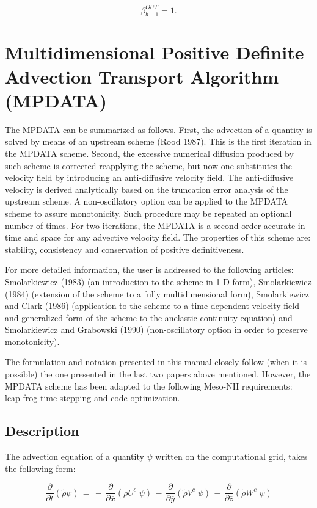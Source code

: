 \begin{equation}
\beta^{OUT}_{b-1}=1.
\end{equation}

\section{Multidimensional Positive Definite Advection Transport Algorithm (MPDATA)}

The MPDATA can be summarized as follows.
First, the advection of a quantity is solved by means of an upstream scheme
(Rood 1987). This is the first iteration in the MPDATA scheme.
Second, the excessive numerical diffusion produced by such scheme is
corrected reapplying the scheme, but now one substitutes the velocity field by
introducing an
anti-diffusive velocity field. The anti-diffusive velocity is derived analytically
based on the truncation error analysis of the upstream scheme.
A non-oscillatory option can be applied to the MPDATA scheme to assure monotonicity.
Such procedure may be repeated an optional number
of times. For two iterations, the  MPDATA is a second-order-accurate in time
and space for any
advective velocity field.
The properties
of this scheme are: stability, consistency and conservation of positive
definitiveness.

For more detailed information, the user is addressed to the following articles:
Smolarkiewicz (1983) (an introduction to the scheme in 1-D form), Smolarkiewicz
(1984) (extension of the scheme to a fully multidimensional form), Smolarkiewicz
and Clark (1986) (application to the scheme to a time-dependent velocity field
and generalized form of the scheme
to the anelastic continuity equation) and Smolarkiewicz and
Grabowski (1990) (non-oscillatory option in order to preserve monotonicity).

The formulation and notation presented in this manual closely follow (when
it is possible) the one
presented in the last two papers above mentioned. However, the MPDATA scheme
has been adapted to the following Meso-NH requirements: leap-frog time stepping and
code optimization.

\subsection{Description}

The advection equation of a quantity $\psi$ written on the computational
grid, takes the following form:

\begin{equation}
\dfrac{\partial}{\partial t}(\tilde{\rho}\psi) \, =
 \, - \, \dfrac{\partial }{\partial \overline{x}} (\tilde{\rho} U^{c} \;  \psi)
 \, - \, \dfrac{\partial }{\partial \overline{y}} (\tilde{\rho} V^{c} \;  \psi)
 \, - \, \dfrac{\partial }{\partial \overline{z}} (\tilde{\rho} W^{c} \;  \psi)
\end{equation}

